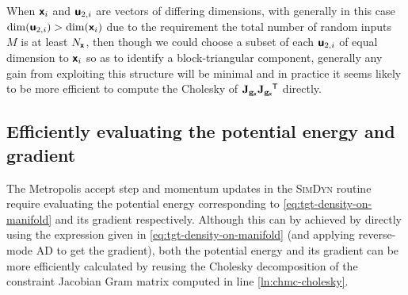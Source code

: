When $\boldsymbol{\mathsf{x}}_i$ and $\boldsymbol{\mathsf{u}}_{2,i}$ are vectors of differing dimensions, with generally in this case $\dim(\boldsymbol{\mathsf{u}}_{2,i}) > \dim(\boldsymbol{\mathsf{x}}_{i})$ due to the requirement the total number of random inputs $M$ is at least $N_{\boldsymbol{\mathsf{x}}}$, then though we could choose a subset of each $\boldsymbol{\mathsf{u}}_{2,i}$ of equal dimension to $\boldsymbol{\mathsf{x}}_i$ so as to identify a block-triangular component, generally any gain from exploiting this structure will be minimal and in practice it seems likely to be more efficient to compute the Cholesky of $\mathbf{J}_{{\mathbf{g}}_{\boldsymbol{\mathsf{x}}}}\mathbf{J}_{{\mathbf{g}}_{\boldsymbol{\mathsf{x}}}}\phantom{}^{\mkern-1.5mu\mathsf{T}}$ directly.


\subsection[Evaluating the potential energy]{Efficiently evaluating the potential energy and gradient}

The Metropolis accept step and momentum updates in the \textsc{SimDyn} routine require evaluating the potential energy corresponding to \eqref{eq:tgt-density-on-manifold} and its gradient respectively. Although this can by achieved by directly using the expression given in \eqref{eq:tgt-density-on-manifold} (and applying reverse-mode \ac{AD} to get the gradient), both the potential energy and its gradient can be more efficiently calculated by reusing the Cholesky decomposition of the constraint Jacobian Gram matrix computed in line \ref{ln:chmc-cholesky}.


